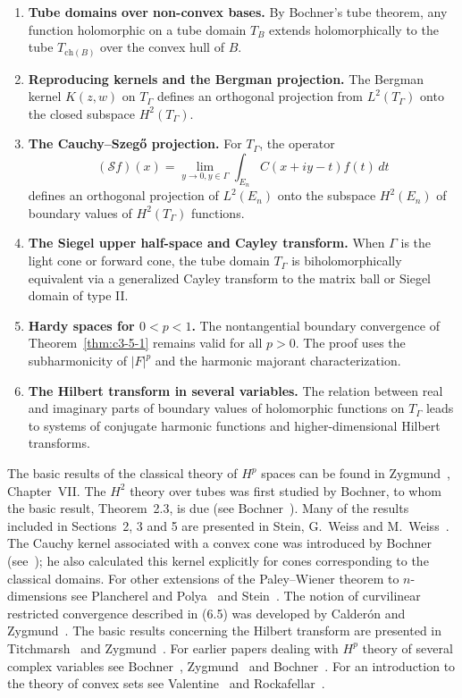 \begin{enumerate}
\item[6.1.] \textbf{Tube domains over non-convex bases.} By Bochner's tube theorem, any function holomorphic on a tube domain $T_B$ extends holomorphically to the tube $T_{\text{ch}(B)}$ over the convex hull of $B$.

\item[6.2.] \textbf{Reproducing kernels and the Bergman projection.} The Bergman kernel $K(z, w)$ on $T_\Gamma$ defines an orthogonal projection from $L^2(T_\Gamma)$ onto the closed subspace $H^2(T_\Gamma)$.

\item[6.3.] \textbf{The Cauchy--Szeg\H{o} projection.} For $T_\Gamma$, the operator
\[
(\mathcal{S}f)(x) = \lim_{y \to 0, y \in \Gamma} \int_{E_n} C(x + iy - t) f(t)\,dt
\]
defines an orthogonal projection of $L^2(E_n)$ onto the subspace $H^2(E_n)$ of boundary values of $H^2(T_\Gamma)$ functions.

\item[6.4.] \textbf{The Siegel upper half-space and Cayley transform.} When $\Gamma$ is the light cone or forward cone, the tube domain $T_\Gamma$ is biholomorphically equivalent via a generalized Cayley transform to the matrix ball or Siegel domain of type II.

\item[6.5.] \textbf{Hardy spaces for $0 < p < 1$.} The nontangential boundary convergence of Theorem~\ref{thm:c3-5-1} remains valid for all $p > 0$. The proof uses the subharmonicity of $|F|^p$ and the harmonic majorant characterization.

\item[6.6.] \textbf{The Hilbert transform in several variables.} The relation between real and imaginary parts of boundary values of holomorphic functions on $T_\Gamma$ leads to systems of conjugate harmonic functions and higher-dimensional Hilbert transforms.
\end{enumerate}

\bibnoteshead

The basic results of the classical theory of $H^p$ spaces can be found in Zygmund~\cite{Zygmund1}, Chapter~VII. The $H^2$ theory over tubes was first studied by Bochner, to whom the basic result, Theorem~2.3, is due (see Bochner~\cite{Bochner8}). Many of the results included in Sections~2, 3 and 5 are presented in Stein, G.~Weiss and M.~Weiss~\cite{SteinWeissWeiss1}. The Cauchy kernel associated with a convex cone was introduced by Bochner (see~\cite{Bochner1}); he also calculated this kernel explicitly for cones corresponding to the classical domains. For other extensions of the Paley--Wiener theorem to $n$-dimensions see Plancherel and Polya~\cite{PlancherelPolya1} and Stein~\cite{Stein1}. The notion of curvilinear restricted convergence described in (6.5) was developed by Calder\'on and Zygmund~\cite{CalderonZygmund1}. The basic results concerning the Hilbert transform are presented in Titchmarsh~\cite{Titchmarsh2} and Zygmund~\cite{Zygmund1}. For earlier papers dealing with $H^p$ theory of several complex variables see Bochner~\cite{Bochner2}, Zygmund~\cite{Zygmund3} and Bochner~\cite{Bochner5}. For an introduction to the theory of convex sets see Valentine~\cite{Valentine1} and Rockafellar~\cite{Rockafellar1}.
